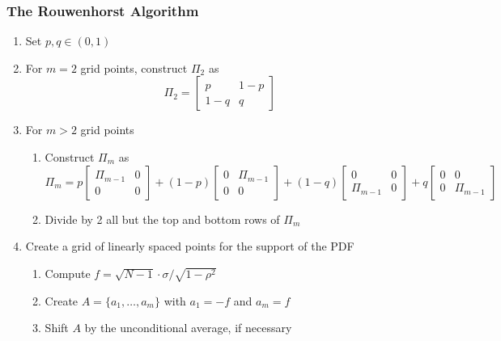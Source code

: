 \documentclass[10pt, aspectratio=1610, handout]{beamer}
\begin{document}
  \begin{frame}
    \frametitle{The Rouwenhorst Algorithm}

    \begin{enumerate}
      \item Set $p, q \in (0, 1)$
      \vfill\pause
      \item For $m=2$ grid points, construct $\Pi_2$ as
        \begin{equation*}
          \Pi_2 =
          \begin{bmatrix}
            p & 1 - p \\
            1 - q & q
          \end{bmatrix}
        \end{equation*}
      \vfill\pause
      \item For $m > 2$ grid points
        \begin{enumerate}
          \item Construct $\Pi_m$ as
            \begin{equation*}
              \Pi_m =
              p
              \begin{bmatrix}
                \Pi_{m-1} & 0 \\ 0 & 0
              \end{bmatrix}
              + (1 - p)
              \begin{bmatrix}
                0 & \Pi_{m-1} \\ 0 & 0
              \end{bmatrix}
              + (1 - q)
              \begin{bmatrix}
                0 & 0 \\ \Pi_{m-1} & 0
              \end{bmatrix}
              + q
              \begin{bmatrix}
                0 & 0 \\ 0 & \Pi_{m-1}
              \end{bmatrix}
            \end{equation*}
          \item Divide by 2 all but the top and bottom rows of $\Pi_m$ \hfill {}
        \end{enumerate}
      \vfill\pause
      \item Create a grid of linearly spaced points for the support of the PDF
        \begin{enumerate}
          \item Compute $f = \sqrt{N - 1} \cdot \sigma / \sqrt{1 - \rho^2}$ \hfill {}
          \item Create $A = \{ a_1, \ldots, a_m \}$ with $a_1 = -f$ and $a_m = f$
          \item Shift $A$ by the unconditional average, if necessary
        \end{enumerate}
    \end{enumerate}


\end{frame}
\end{document}
